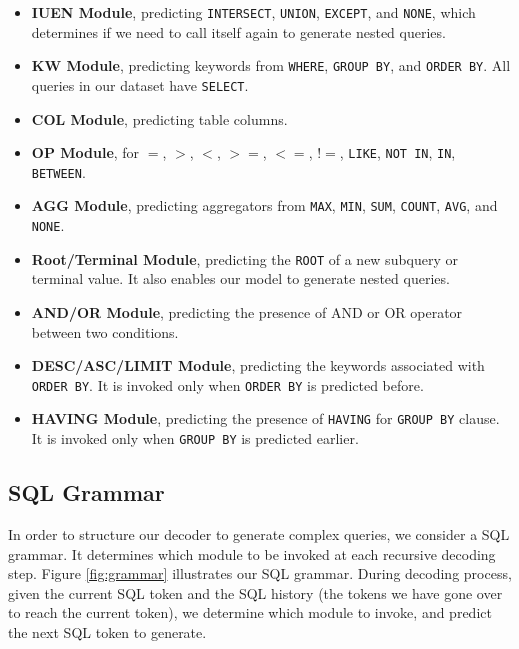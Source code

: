 \documentclass[11pt,a4paper]{article}
\begin{document}
\begin{itemize}
\setlength{\itemsep}{0mm}
\setlength{\leftskip}{-1mm}
    \item \textbf{IUEN Module}, predicting \texttt{INTERSECT}, \texttt{UNION}, \texttt{EXCEPT}, and \texttt{NONE}, which determines if we need to call itself again to generate nested queries.
    \item \textbf{KW Module}, predicting keywords from \texttt{WHERE}, \texttt{GROUP BY}, and \texttt{ORDER BY}. All queries in our dataset have \texttt{SELECT}.
    \item \textbf{COL Module}, predicting table columns.
    \item \textbf{OP Module}, for $=$, $>$, $<$, $>=$, $<=$, $!\!\!\!=$, \texttt{LIKE}, \texttt{NOT IN}, \texttt{IN}, \texttt{BETWEEN}.
    \item \textbf{AGG Module}, predicting aggregators from \texttt{MAX}, \texttt{MIN}, \texttt{SUM}, \texttt{COUNT}, \texttt{AVG}, and \texttt{NONE}.
    \item \textbf{Root/Terminal Module}, predicting the \texttt{ROOT} of a new subquery or terminal value. It also enables our model to generate nested queries.
    \item \textbf{AND/OR Module}, predicting the presence of AND or OR operator between two conditions.
    \item \textbf{DESC/ASC/LIMIT Module},  predicting the keywords associated with \texttt{ORDER BY}. It is invoked only when \texttt{ORDER BY} is predicted before.
    \item \textbf{HAVING Module}, predicting the presence of \texttt{HAVING} for \texttt{GROUP BY} clause. It is invoked only when \texttt{GROUP BY} is predicted earlier. \vspace{-2mm}
\end{itemize} 


\subsection{SQL Grammar}

In order to structure our decoder to generate complex queries, we consider a SQL grammar.
It determines which module to be invoked at each recursive decoding step.
Figure \ref{fig:grammar} illustrates our SQL grammar.
During decoding process, given the current SQL token and the SQL history (the tokens we have gone over to reach the current token), we determine which module to invoke, and predict the next SQL token to generate.
\end{document}
